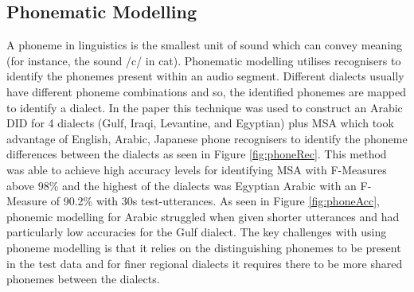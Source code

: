 \subsection{Phonematic Modelling}\label{sec:phonematic}
A phoneme in linguistics is the smallest unit of sound which can convey meaning (for instance, the sound /c/ in cat). 
Phonematic modelling utilises recognisers to identify the phonemes present within an audio segment. 
Different dialects usually have different phoneme combinations and so, the identified phonemes are mapped 
to identify a dialect. In the paper \cite{biadsy_dialect_2011} this technique was used to construct an Arabic DID for 4 dialects (Gulf, Iraqi, Levantine, and Egyptian) plus MSA which took advantage of  
English, Arabic, Japanese phone recognisers to identify the phoneme differences between the dialects as seen in Figure \ref{fig:phoneRec}. This method was able to achieve high accuracy 
levels for identifying MSA with F-Measures above 98\% and the highest of the dialects was Egyptian Arabic with an F-Measure of 90.2\% with 30s test-utterances. As seen in Figure \ref{fig:phoneAcc},  
phonemic modelling for Arabic struggled when given shorter utterances and had particularly low accuracies for the Gulf dialect. The key challenges with using phoneme modelling is that 
it relies on the distinguishing phonemes to be present in the test data and for finer regional dialects it requires there to be more shared phonemes between the dialects.

\begin{figure}[H]
\end{figure}

